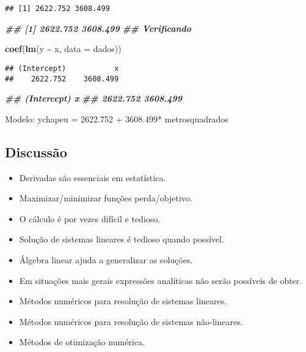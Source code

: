 \documentclass[
]{article}
\newenvironment{Shaded}{\begin{snugshade}}{\end{snugshade}}
\newcommand{\AttributeTok}[1]{\textcolor[rgb]{0.13,0.29,0.53}{#1}}
\newcommand{\DocumentationTok}[1]{\textcolor[rgb]{0.56,0.35,0.01}{\textbf{\textit{#1}}}}
\newcommand{\FunctionTok}[1]{\textcolor[rgb]{0.13,0.29,0.53}{\textbf{#1}}}
\newcommand{\NormalTok}[1]{#1}
\newcommand{\SpecialCharTok}[1]{\textcolor[rgb]{0.81,0.36,0.00}{\textbf{#1}}}
\providecommand{\tightlist}{%
  \setlength{\itemsep}{0pt}\setlength{\parskip}{0pt}}
\begin{document}
\begin{verbatim}
## [1] 2622.752 3608.499
\end{verbatim}

\begin{Shaded}
\begin{Highlighting}[]
\DocumentationTok{\#\# [1] 2622.752 3608.499}
\DocumentationTok{\#\# Verificando}
\end{Highlighting}
\end{Shaded}

\begin{Shaded}
\begin{Highlighting}[]
\FunctionTok{coef}\NormalTok{(}\FunctionTok{lm}\NormalTok{(y }\SpecialCharTok{\textasciitilde{}}\NormalTok{ x, }\AttributeTok{data =}\NormalTok{ dados))}
\end{Highlighting}
\end{Shaded}

\begin{verbatim}
## (Intercept)           x 
##    2622.752    3608.499
\end{verbatim}

\begin{Shaded}
\begin{Highlighting}[]
\DocumentationTok{\#\# (Intercept) x}
\DocumentationTok{\#\# 2622.752 3608.499}
\end{Highlighting}
\end{Shaded}

Modelo: ychapeu = 2622.752 + 3608.499* metrosquadrados

\hypertarget{discussuxe3o}{%
\subsection{Discussão}\label{discussuxe3o}}

\begin{itemize}
\tightlist
\item
  Derivadas são essenciais em estatística.
\item
  Maximizar/minimizar funções perda/objetivo.
\item
  O cálculo é por vezes difícil e tedioso.
\item
  Solução de sistemas lineares é tedioso quando possível.
\item
  Álgebra linear ajuda a generalizar as soluções.
\item
  Em situações mais gerais expressões analíticas não serão possíveis de
  obter.
\item
  Métodos numéricos para resolução de sistemas lineares.
\item
  Métodos numéricos para resolução de sistemas não-lineares.
\item
  Métodos de otimização numérica.
\end{itemize}
\end{document}
